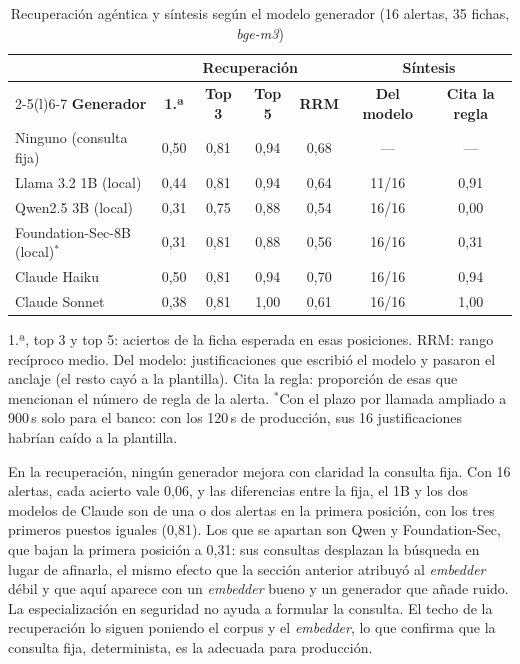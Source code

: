 \begin{table}[H]
  \centering
  \caption{Recuperación agéntica y síntesis según el modelo generador (16 alertas, 35 fichas, \emph{bge-m3})}
  \label{tab:modelos}
  \setlength{\tabcolsep}{5pt}
  \begin{tabular}{@{}lcccccc@{}}
    \toprule
    & \multicolumn{4}{c}{\textbf{Recuperación}} & \multicolumn{2}{c}{\textbf{Síntesis}} \\
    \cmidrule(lr){2-5}\cmidrule(l){6-7}
    \textbf{Generador} & \textbf{1.ª} & \textbf{Top 3} & \textbf{Top 5} & \textbf{RRM} & \textbf{Del modelo} & \textbf{Cita la regla} \\
    \midrule
    Ninguno (consulta fija) & 0,50 & 0,81 & 0,94 & 0,68 & --- & --- \\
    Llama 3.2 1B (local) & 0,44 & 0,81 & 0,94 & 0,64 & 11/16 & 0,91 \\
    Qwen2.5 3B (local) & 0,31 & 0,75 & 0,88 & 0,54 & 16/16 & 0,00 \\
    Foundation-Sec-8B (local)$^{*}$ & 0,31 & 0,81 & 0,88 & 0,56 & 16/16 & 0,31 \\
    Claude Haiku & 0,50 & 0,81 & 0,94 & 0,70 & 16/16 & 0,94 \\
    Claude Sonnet & 0,38 & 0,81 & 1,00 & 0,61 & 16/16 & 1,00 \\
    \bottomrule
  \end{tabular}
  \par\smallskip
  {\footnotesize 1.ª, top 3 y top 5: aciertos de la ficha esperada en esas posiciones. RRM: rango
  recíproco medio. Del modelo: justificaciones que escribió el modelo y pasaron el anclaje (el resto
  cayó a la plantilla). Cita la regla: proporción de esas que mencionan el número de regla de la alerta.
  $^{*}$Con el plazo por llamada ampliado a 900\,s solo para el banco: con los 120\,s de producción,
  sus 16 justificaciones habrían caído a la plantilla.}
\end{table}

En la recuperación, ningún generador mejora con claridad la consulta fija. Con 16 alertas, cada
acierto vale 0,06, y las diferencias entre la fija, el 1B y los dos modelos de Claude son de una o
dos alertas en la primera posición, con los tres primeros puestos iguales (0,81). Los que se
apartan son Qwen y Foundation-Sec, que bajan la primera posición a 0,31: sus consultas desplazan la
búsqueda en lugar de afinarla, el mismo efecto que la sección anterior atribuyó al \emph{embedder}
débil y que aquí aparece con un \emph{embedder} bueno y un generador que añade ruido. La
especialización en seguridad no ayuda a formular la consulta. El techo de la recuperación
lo siguen poniendo el corpus y el \emph{embedder}, lo que confirma que la consulta fija,
determinista, es la adecuada para producción.


